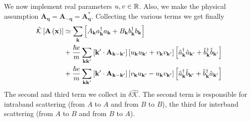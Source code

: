 We now implement real parameters $u,v \in \mathbb{R}$. Also, we make the physical assumption $\mathbf{A}_\mathbf{q} = \mathbf{A}_{-\mathbf{q}} = \mathbf{A}_\mathbf{q}^*$. Collecting the various terms we get finally
\[
\begin{aligned}
	\hat{\mathcal{K}} \left[{\mathbf{A}\left({\mathbf{x}}\right)}\right] &\simeq \sum_\mathbf{k} \left[{A_\mathbf{k} a_\mathbf{k}^\dagger a_\mathbf{k} + B_\mathbf{k} b_\mathbf{k}^\dagger b_\mathbf{k}}\right] \\
	&+ \frac{\hbar e}{m} \sum_{\mathbf{k} \mathbf{k}'} \left[{\mathbf{k}' \cdot \mathbf{A}_{\mathbf{k}-\mathbf{k}'} }\right] \left[{ \vphantom{k'} u_\mathbf{k} u_{\mathbf{k}'} + v_\mathbf{k} v_{\mathbf{k}'} }\right] \left[{\hat{a}_\mathbf{k}^\dagger \hat{a}_{\mathbf{k}'} + \hat{b}_\mathbf{k}^\dagger \hat{b}_{\mathbf{k}'} }\right]\\
	&+ \frac{\hbar e}{m} \sum_{\mathbf{k} \mathbf{k}'} \left[{\mathbf{k}' \cdot \mathbf{A}_{\mathbf{k}-\mathbf{k}'} }\right] \left[{ \vphantom{k'} v_\mathbf{k} u_{\mathbf{k}'} - u_\mathbf{k} v_{\mathbf{k}'} }\right] \left[{\hat{a}_\mathbf{k}^\dagger \hat{b}_{\mathbf{k}'} + \hat{b}_\mathbf{k}^\dagger \hat{a}_{\mathbf{k}'} }\right]\\
\end{aligned}
\]
The second and third term we collect in $\delta \hat{\mathcal{K}}$. The second term is responsible for intraband scattering (from $A$ to $A$ and from $B$ to $B$), the third for interband scattering (from $A$ to $B$ and from $B$ to $A$).


